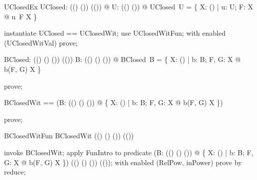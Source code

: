 \documentclass{article}
\begin{document}
\begin{theorem}{UClosedEx}
  \exists UClosed: \power ((\nat \fun \nat) \fun (\nat \fun \nat)) \fun \power (\power (\nat \fun \nat)) @ \forall U: \power ((\nat \fun \nat) \fun (\nat \fun \nat)) @ UClosed~U = \{ X: \power (\nat \fun \nat) | \forall u: U; F: X @ u~F \in X \}
\end{theorem}

\begin{zproof}
instantiate UClosed == UClosedWit;
use UClosedWitFun;
with enabled (UClosedWitVal) prove;
\end{zproof}



\begin{axdef}
  BClosed: \power ((\nat \fun \nat) \cross (\nat \fun \nat) \fun (\nat \fun \nat)) \fun \power (\power (\nat \fun \nat))
\where
   \forall B: \power ((\nat \fun \nat) \cross (\nat \fun \nat) \fun (\nat \fun \nat)) @ BClosed~B = \{ X: \power (\nat \fun \nat) | \forall b: B; F, G: X @ b(F, G) \in X \}
\end{axdef}

\begin{zproof}
prove;
\end{zproof}

\begin{zed}
  BClosedWit == (\lambda B: \power ((\nat \fun \nat) \cross (\nat \fun \nat) \fun (\nat \fun \nat)) @ \{ X: \power (\nat \fun \nat) | \forall b: B; F, G: X @ b(F, G) \in X \})
\end{zed}

\begin{zproof}
prove;
\end{zproof}

\begin{theorem}{BClosedWitFun}
  BClosedWit \in \power ((\nat \fun \nat) \cross (\nat \fun \nat) \fun (\nat \fun \nat)) \fun \power (\power (\nat \fun \nat))
\end{theorem}

\begin{zproof}
invoke BClosedWit;
apply FunIntro to predicate (\lambda B: \power ((\nat \fun \nat) \cross (\nat \fun \nat) \fun (\nat \fun \nat)) @ \{ X: \power (\nat \fun \nat) | \forall b: B; F, G: X @ b(F, G) \in X \}) \in \power ((\nat \fun \nat) \cross (\nat \fun \nat) \fun (\nat \fun \nat)) \fun \power (\power (\nat \fun \nat));
with enabled (RelPow, inPower) prove by reduce;
\end{zproof}
\end{document}
